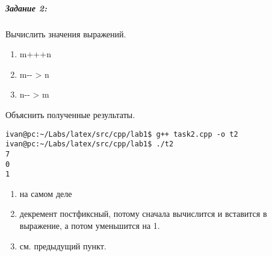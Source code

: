 \subparagraph{Задание 2:}
Вычислить значения выражений.
\begin{ttfamily}
    \begin{enumerate}
        \item m+++n
        \item m-{}- > n
        \item n-{}- > m
    \end{enumerate}
\end{ttfamily}
Объяснить полученные результаты.


\begin{lstlisting}[label={lst:bash}]
ivan@pc:~/Labs/latex/src/cpp/lab1$ g++ task2.cpp -o t2
ivan@pc:~/Labs/latex/src/cpp/lab1$ ./t2
7
0
1
\end{lstlisting}
\begin{enumerate}
    \item {} на самом деле 
    \item {} декремент постфиксный, потому сначала вычислится
             и вставится в выражение, а потом  уменьшится на 1.
    \item {} см.{} предыдущий пункт.
\end{enumerate}